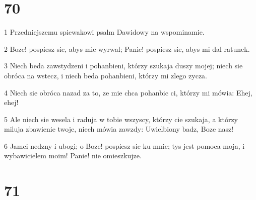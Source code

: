 \chapter{70}

\par 1 Przedniejszemu spiewakowi psalm Dawidowy na wspominamie.
\par 2 Boze! pospiesz sie, abys mie wyrwal; Panie! pospiesz sie, abys mi dal ratunek.
\par 3 Niech beda zawstydzeni i pohanbieni, którzy szukaja duszy mojej; niech sie obróca na wstecz, i niech beda pohanbieni, którzy mi zlego zycza.
\par 4 Niech sie obróca nazad za to, ze mie chca pohanbic ci, którzy mi mówia: Ehej, ehej!
\par 5 Ale niech sie wesela i raduja w tobie wszyscy, którzy cie szukaja, a którzy miluja zbawienie twoje, niech mówia zawzdy: Uwielbiony badz, Boze nasz!
\par 6 Jamci nedzny i ubogi; o Boze! pospiesz sie ku mnie; tys jest pomoca moja, i wybawicielem moim! Panie! nie omieszkujze.

\chapter{71}

